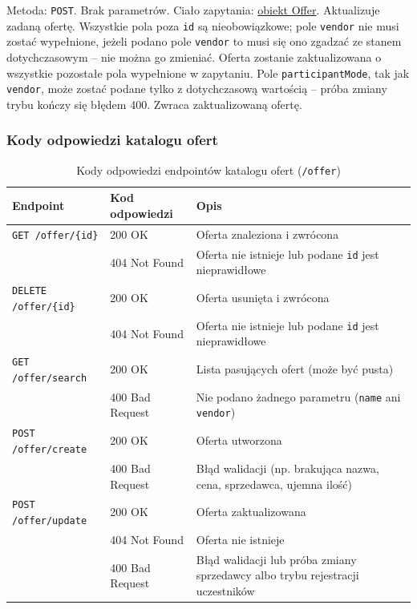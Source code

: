 \documentclass[11pt]{article}
\begin{document}
Metoda: \texttt{POST}. Brak parametrów. Ciało zapytania: \hyperref[schema:offer]{obiekt Offer}. Aktualizuje zadaną ofertę. Wszystkie pola poza \texttt{id} są nieobowiązkowe; pole \texttt{vendor} nie musi zostać wypełnione, jeżeli podano pole \texttt{vendor} to musi się ono zgadzać ze stanem dotychczasowym -- nie można go zmieniać. Oferta zostanie zaktualizowana o wszystkie pozostałe pola wypełnione w zapytaniu. Pole \texttt{participantMode}, tak jak \texttt{vendor}, może zostać podane tylko z dotychczasową wartością -- próba zmiany trybu kończy się błędem 400. Zwraca zaktualizowaną ofertę.

\subsubsection{Kody odpowiedzi katalogu ofert}

\begin{table}[H]
  \centering
  \renewcommand{\arraystretch}{1.3}
  \begin{tabularx}{\textwidth}{|l|l|X|}
    \hline
    \textbf{Endpoint} & \textbf{Kod odpowiedzi} & \textbf{Opis} \\
    \hline
    \texttt{GET /offer/\{id\}} & 200 OK & Oferta znaleziona i zwrócona \\
    & 404 Not Found & Oferta nie istnieje lub podane \texttt{id} jest nieprawidłowe \\
    \hline
    \texttt{DELETE /offer/\{id\}} & 200 OK & Oferta usunięta i zwrócona \\
    & 404 Not Found & Oferta nie istnieje lub podane \texttt{id} jest nieprawidłowe \\
    \hline
    \texttt{GET /offer/search} & 200 OK & Lista pasujących ofert (może być pusta) \\
    & 400 Bad Request & Nie podano żadnego parametru (\texttt{name} ani \texttt{vendor}) \\
    \hline
    \texttt{POST /offer/create} & 200 OK & Oferta utworzona \\
    & 400 Bad Request & Błąd walidacji (np. brakująca nazwa, cena, sprzedawca, ujemna ilość) \\
    \hline
    \texttt{POST /offer/update} & 200 OK & Oferta zaktualizowana \\
    & 404 Not Found & Oferta nie istnieje \\
    & 400 Bad Request & Błąd walidacji lub próba zmiany sprzedawcy albo trybu rejestracji uczestników \\
    \hline
  \end{tabularx}
  \caption{Kody odpowiedzi endpointów katalogu ofert (\texttt{/offer})}
  \label{tab:offer-response-codes}
\end{table}
\end{document}
